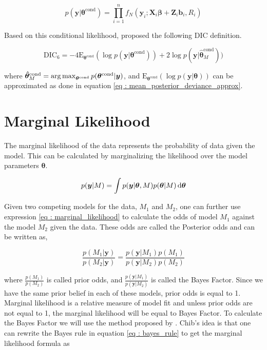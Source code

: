 \begin{equation}
\label{eq : conditional_data_likelihood}
p(\boldsymbol{y}|\boldsymbol{\theta}^\text{cond}) = \prod_{i=1}^n f_N(\boldsymbol{y}_i; \boldsymbol{X}_i\boldsymbol{\beta} + \boldsymbol{Z}_i \boldsymbol{b}_i, R_i)
\end{equation}

Based on this conditional likelihood, \citet{celeux_deviance_2006} proposed the following DIC definition.

\begin{equation}
\label{eq : DIC6}
\text{DIC}_6 = -4\text{E}_{\boldsymbol{\theta}^\text{cond}} (\log{p(\boldsymbol{y}|\boldsymbol{\theta}^\text{cond})}) + 2\log{p(\boldsymbol{y}|\boldsymbol{\hat{\theta}}^\text{cond}_M)})
\end{equation}

where
$\boldsymbol{\hat{\theta}}^\text{cond}_M = \operatorname*{arg\,max}_{\boldsymbol{\theta}^\text{cond}}p(\boldsymbol{\theta}^\text{cond}|\boldsymbol{y})$, and $\text{E}_{\boldsymbol{\theta}^\text{cond}} (\log{p(\boldsymbol{y}|\boldsymbol{\theta})})$ can be approximated as done in equation \ref{eq : mean_posterior_deviance_approx}.

\section{Marginal Likelihood}
\label{sec : marginal_likelihood}

The marginal likelihood of the data represents the probability of data given the model. This can be calculated by marginalizing the likelihood over the model parameters $\boldsymbol{\theta}$. 

\begin{equation}
\label{eq : marginal_likelihood}
p(\boldsymbol{y}|M) = \int p(\boldsymbol{y}|\boldsymbol{\theta}, M) p(\boldsymbol{\theta}|M) \mathop{}\!\mathrm{d} \boldsymbol{\theta}
\end{equation}

Given two competing models for the data, $M_1$ and $M_2$, one can further use expression \ref{eq : marginal_likelihood} to calculate the odds of model $M_1$ against the model $M_2$ given the data. These odds are called the Posterior odds and can be written as,

$$\frac {p(M_1|\boldsymbol{y})}{p(M_2|\boldsymbol{y})} = \frac {p(\boldsymbol{y}|M_1) p(M_1)} {p(\boldsymbol{y}|M_2) p(M_2)}$$

where $\frac {p(M_1)}{p(M_2)}$ is called prior odds, and $\frac {p(\boldsymbol{y}|M_1)} {p(\boldsymbol{y}|M_2)}$ is called the Bayes Factor. Since we have the same prior belief in each of these models, prior odds is equal to 1. Marginal likelihood is a relative measure of model fit and unless prior odds are not equal to 1, the marginal likelihood will be equal to Bayes Factor. To calculate the Bayes Factor we will use the method proposed by \citet{chib_marginal_1995}. Chib's idea is that one can rewrite the Bayes rule in equation \ref{eq : bayes_rule} to get the marginal likelihood formula as

